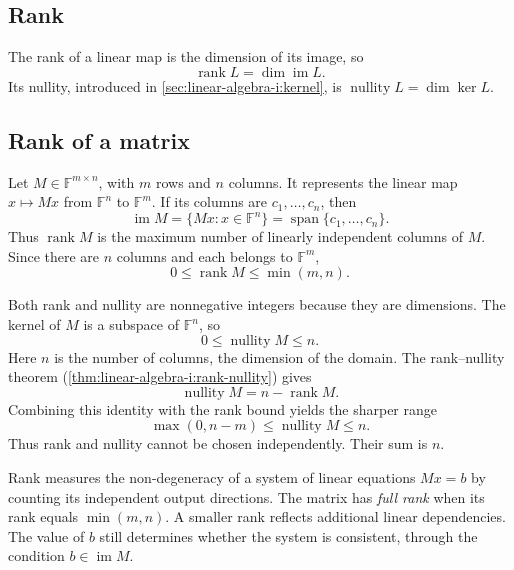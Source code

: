 \begin{samepage}
\section{Rank}
\label{sec:linear-algebra-i:rank}

\begin{definition}
  The rank of a linear map is the dimension of its image, so
  \[
    \operatorname{rank}L=\dim\operatorname{im}L.
  \]
  Its nullity, introduced in \autoref{sec:linear-algebra-i:kernel},
  is \(\operatorname{nullity}L=\dim\ker L\).
\end{definition}
\end{samepage}

\subsection{Rank of a matrix}

Let \(M\in\mathbb F^{m\times n}\), with \(m\) rows and \(n\) columns.
It represents the linear map \(x\mapsto Mx\) from \(\mathbb F^n\)
to \(\mathbb F^m\). If its columns are \(c_1,\ldots,c_n\), then
\[
  \operatorname{im}M=\{Mx:x\in\mathbb F^n\}
    =\operatorname{span}\{c_1,\ldots,c_n\}.
\]
Thus \(\operatorname{rank}M\) is the maximum number of linearly
independent columns of \(M\). Since there are \(n\) columns and each
belongs to \(\mathbb F^m\),
\[
  0\leq\operatorname{rank}M\leq\min(m,n).
\]

Both rank and nullity are nonnegative integers because they are dimensions.
The kernel of \(M\) is a subspace of \(\mathbb F^n\), so
\[
  0\leq\operatorname{nullity}M\leq n.
\]
Here \(n\) is the number of columns, the dimension of the domain.
The rank--nullity theorem (\autoref{thm:linear-algebra-i:rank-nullity})
gives
\[
  \operatorname{nullity}M=n-\operatorname{rank}M.
\]
Combining this identity with the rank bound yields the sharper range
\[
  \max(0,n-m)\leq\operatorname{nullity}M\leq n.
\]
Thus rank and nullity cannot be chosen independently. Their sum is \(n\).

Rank measures the non-degeneracy of a system of linear equations
\(Mx=b\) by counting its independent output directions. The matrix
has \emph{full rank} when its rank equals \(\min(m,n)\). A smaller
rank reflects additional linear dependencies. The value of \(b\)
still determines whether the system is consistent, through the
condition \(b\in\operatorname{im}M\).

